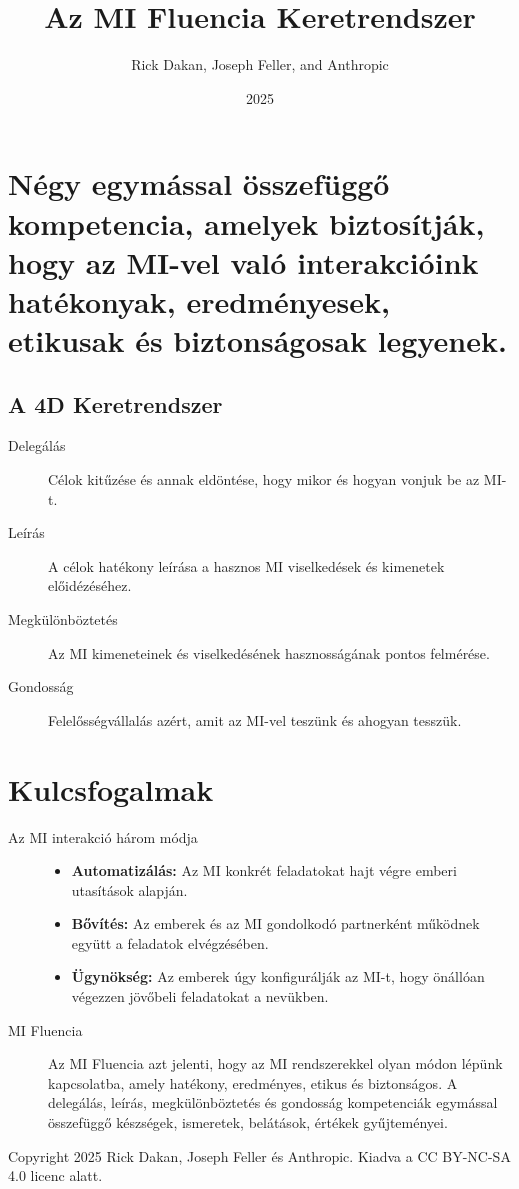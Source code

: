 \documentclass[a4paper, 12pt]{article}
\begin{document}
\title{Az MI Fluencia Keretrendszer}
\author{Rick Dakan, Joseph Feller, and Anthropic}
\date{2025}
\maketitle

\section*{Négy egymással összefüggő kompetencia, amelyek biztosítják, hogy az MI-vel való interakcióink hatékonyak, eredményesek, etikusak és biztonságosak legyenek.}

\subsection*{A 4D Keretrendszer}
\begin{description}
    \item[Delegálás] Célok kitűzése és annak eldöntése, hogy mikor és hogyan vonjuk be az MI-t.
    \item[Leírás] A célok hatékony leírása a hasznos MI viselkedések és kimenetek előidézéséhez.
    \item[Megkülönböztetés] Az MI kimeneteinek és viselkedésének hasznosságának pontos felmérése.
    \item[Gondosság] Felelősségvállalás azért, amit az MI-vel teszünk és ahogyan tesszük.
\end{description}

\section*{Kulcsfogalmak}
\begin{description}
    \item[Az MI interakció három módja]
    \begin{itemize}
        \item \textbf{Automatizálás:} Az MI konkrét feladatokat hajt végre emberi utasítások alapján.
        \item \textbf{Bővítés:} Az emberek és az MI gondolkodó partnerként működnek együtt a feladatok elvégzésében.
        \item \textbf{Ügynökség:} Az emberek úgy konfigurálják az MI-t, hogy önállóan végezzen jövőbeli feladatokat a nevükben.
    \end{itemize}
    \item[MI Fluencia] Az MI Fluencia azt jelenti, hogy az MI rendszerekkel olyan módon lépünk kapcsolatba, amely hatékony, eredményes, etikus és biztonságos. A delegálás, leírás, megkülönböztetés és gondosság kompetenciák egymással összefüggő készségek, ismeretek, belátások, értékek gyűjteményei.
\end{description}

\vspace{\fill}
\begin{center}
    \small{Copyright 2025 Rick Dakan, Joseph Feller és Anthropic. Kiadva a CC BY-NC-SA 4.0 licenc alatt.}
\end{center}
\end{document}
